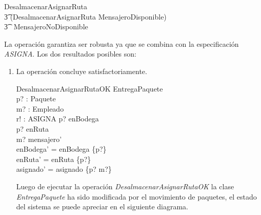 \documentclass[12pt,a4paper,zed]{article}
\renewcommand*{\defs}{\mathrel{\widehat{=}}}
\begin{document}
\begin{zed}
DesalmacenarAsignarRuta\defs\\
\t3 (DesalmacenarAsignarRuta \wedge MensajeroDisponible)\\
\t3 \vee ~MensajeroNoDisponible
\end{zed}

La operación garantiza ser robusta ya que se combina con la especificación \textit{ASIGNA}. Los dos resultados posibles son:
\begin{enumerate}
\item La operación concluye satisfactoriamente.

\begin{schema}{DesalmacenarAsignarRutaOK}
\Delta EntregaPaquete\\
p? : Paquete\\
m? : Empleado\\
r! : ASIGNA
\where
p? \in enBodega\\
p? \notin  enRuta\\
m? \in mensajero'\\
enBodega' = enBodega \setminus \{p?\}\\
enRuta' = enRuta \cup \{p?\}\\
asignado' = asignado \cup \{p? \mapsto m?\}
\end{schema}

Luego de ejecutar la operación \textit{DesalmacenarAsignarRutaOK} la clase \textit{EntregaPaquete} ha sido modificada por el movimiento de paquetes, el estado del sistema se puede apreciar en el siguiente diagrama.

\begin{figure}[h]
\centering
{}
\end{figure}
\end{enumerate}
\end{document}
